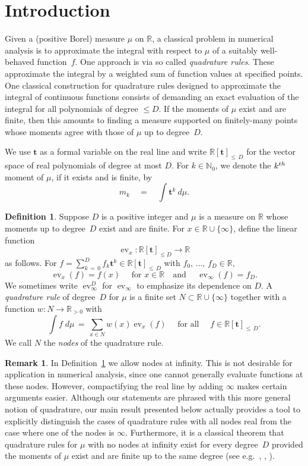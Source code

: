 \documentclass[11pt]{article}
\theoremstyle{definition}
\newtheorem{defi}[theo]{Definition}
\newtheorem{rema}[theo]{Remark}
\numberwithin{equation}{section}
\numberwithin{figure}{section}
\numberwithin{table}{section}
\DeclareMathOperator\ev{ev}
\newcommand\N{\mathbb N}
\newcommand\R{\mathbb R}
\renewcommand\t{\mathbf{t}}
\begin{document}
\section{Introduction}\label{intro}

Given a (positive Borel) measure $\mu$ on $\R$, a classical problem in numerical analysis is to approximate the integral with respect to $\mu$ of a suitably well-behaved function~$f$. One approach is via so called \emph{quadrature rules}. These approximate the integral by a weighted sum of function values at specified points. One classical construction for quadrature rules designed to approximate the integral of continuous functions consists of demanding an exact evaluation of the integral for all polynomials of degree $\leq D$. If the moments of $\mu$ exist and are finite, then this amounts to finding a measure supported on finitely-many points whose moments agree with those of $\mu$ up to degree~$D$.

We use $\t$ as a formal variable on the real line and write $\R[\t]_{\leq\,D}$ for the vector space of real polynomials of degree at most $D$. For $k \in
\N_0$, we denote the $k^{\rm th}$ moment of $\mu$, if it exists and is finite, by
\[
m_k \quad = \quad \int \t^k \ d\mu.
\]

\begin{defi}\label{dfqr}
Suppose $D$ is a positive integer and $\mu$ is a measure on $\R$ whose moments up to degree~$D$ exist and are finite. For $x \in \R \cup \{\infty\}$, define the linear function
\[
\ev_x:\R[\t]_{\leq D} \rightarrow \R
\]
as follows. For $f = \sum_{k\,=\,0}^Df_k \t^k \in \R[\t]_{\leq\,D}$ with $f_0,\,\ldots,\,f_D\in\R,$
\[
\ev_x(f) = f(x) \quad \text{ for }x\in \R \quad \text{and } \quad \ev_{\infty}(f) = f_D.
\]
We sometimes write $\ev_{\infty}^D$ for $\ev_{\infty}$ to emphasize its dependence on $D$. A \emph{quadrature rule} of degree~$D$ for $\mu$ is a finite set $N\subset \R\cup\{\infty\}$ together with a function $w\colon N\to\R_{>0}$ with
\[
\int f \; d \mu \, = \, \sum_{x\in N}w(x) \ev_x(f) \quad \text{ for all }\quad f\in\R[\t]_{\leq\,D}.
\]
We call $N$ the \emph{nodes} of the quadrature rule.
\end{defi}


\begin{rema}
In Definition~\ref{dfqr} we allow nodes at infinity. This is not desirable for application in numerical analysis, since one cannot generally evaluate functions at these nodes. However, compactifying the real line by adding $\infty$ makes certain arguments easier. Although our statements are phrased with this more general notion of quadrature, our main result presented below actually provides a tool to explicitly distinguish the cases of quadrature rules with all nodes real from the case where one of the nodes is $\infty$. Furthermore, it is a classical theorem that quadrature rules for $\mu$ with no nodes at infinity exist for every degree~$D$ provided the moments of $\mu$ exist and are finite up to the same degree (see e.g.~\cite[Theorem~5.8]{la1}, \cite[Theorem~5.9]{la2}, \cite[Theorem~1.24]{sch}).
\end{rema}
\end{document}
